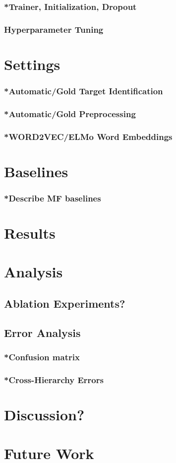 \subsubsection{*Trainer, Initialization, Dropout}
\subsubsection{Hyperparameter Tuning}

\section{Settings} \label{sec:psssettings}
\subsubsection{*Automatic/Gold Target Identification}
\subsubsection{*Automatic/Gold Preprocessing}
\subsubsection{*WORD2VEC/ELMo Word Embeddings}

\section{Baselines} \label{sec:pssbaselines}
\subsubsection{*Describe MF baselines}

\section{Results} \label{sec:pssresults}

\section{Analysis} \label{sec:pssanalysis}
\subsection{Ablation Experiments?}
\subsection{Error Analysis}
\subsubsection{*Confusion matrix}
\subsubsection{*Cross-Hierarchy Errors}

\section{Discussion?}

\section{Future Work}

